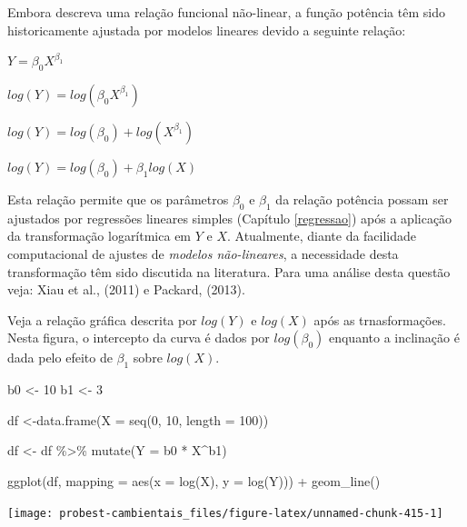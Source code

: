 \documentclass[
]{book}
\newenvironment{Shaded}{\begin{snugshade}}{\end{snugshade}}
\newcommand{\AttributeTok}[1]{\textcolor[rgb]{0.77,0.63,0.00}{#1}}
\newcommand{\DecValTok}[1]{\textcolor[rgb]{0.00,0.00,0.81}{#1}}
\newcommand{\FunctionTok}[1]{\textcolor[rgb]{0.00,0.00,0.00}{#1}}
\newcommand{\NormalTok}[1]{#1}
\newcommand{\OtherTok}[1]{\textcolor[rgb]{0.56,0.35,0.01}{#1}}
\newcommand{\SpecialCharTok}[1]{\textcolor[rgb]{0.00,0.00,0.00}{#1}}
\begin{document}
Embora descreva uma relação funcional não-linear, a função potência têm sido historicamente ajustada por modelos lineares devido a seguinte relação:

\(Y = \beta_{0}X^{\beta_{1}}\)

\(log(Y) = log(\beta_{0}X^{\beta_{1}})\)

\(log(Y) = log(\beta_{0}) + log(X^{\beta_{1}})\)

\(log(Y) = log(\beta_{0}) + \beta_{1}log(X)\)

Esta relação permite que os parâmetros \(\beta_0\) e \(\beta_1\) da relação potência possam ser ajustados por regressões lineares simples (Capítulo \ref{regressao}) após a aplicação da transformação logarítmica em \(Y\) e \(X\). Atualmente, diante da facilidade computacional de ajustes de \emph{modelos não-lineares}, a necessidade desta transformação têm sido discutida na literatura. Para uma análise desta questão veja: Xiau et al., (2011) e Packard, (2013).

Veja a relação gráfica descrita por \(log(Y)\) e \(log(X)\) após as trnasformações. Nesta figura, o intercepto da curva é dados por \(log(\beta_0)\) enquanto a inclinação é dada pelo efeito de \(\beta_1\) sobre \(log(X)\).

\begin{Shaded}
\begin{Highlighting}[]
\NormalTok{b0 }\OtherTok{\textless{}{-}} \DecValTok{10}
\NormalTok{b1 }\OtherTok{\textless{}{-}} \DecValTok{3}

\NormalTok{df }\OtherTok{\textless{}{-}}\FunctionTok{data.frame}\NormalTok{(}\AttributeTok{X =} \FunctionTok{seq}\NormalTok{(}\DecValTok{0}\NormalTok{, }\DecValTok{10}\NormalTok{, }\AttributeTok{length =} \DecValTok{100}\NormalTok{))}

\NormalTok{df }\OtherTok{\textless{}{-}}\NormalTok{ df }\SpecialCharTok{\%\textgreater{}\%} \FunctionTok{mutate}\NormalTok{(}\AttributeTok{Y =}\NormalTok{ b0 }\SpecialCharTok{*}\NormalTok{ X}\SpecialCharTok{\^{}}\NormalTok{b1)}

\FunctionTok{ggplot}\NormalTok{(df, }\AttributeTok{mapping =} \FunctionTok{aes}\NormalTok{(}\AttributeTok{x =} \FunctionTok{log}\NormalTok{(X), }\AttributeTok{y =} \FunctionTok{log}\NormalTok{(Y))) }\SpecialCharTok{+}
  \FunctionTok{geom\_line}\NormalTok{()}
\end{Highlighting}
\end{Shaded}

\begin{center}\texttt{[image: probest-cambientais\_files/figure-latex/unnamed-chunk-415-1]} \end{center}
\end{document}
